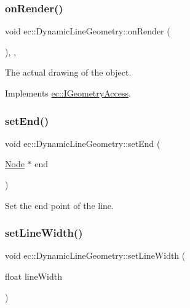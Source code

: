 \subsubsection{\texorpdfstring{on\+Render()}{onRender()}}
{\footnotesize\ttfamily void ec\+::\+Dynamic\+Line\+Geometry\+::on\+Render (\begin{DoxyParamCaption}{ }\end{DoxyParamCaption})\hspace{0.3cm}{\ttfamily [override]}, {\ttfamily [protected]}, {\ttfamily [virtual]}}



The actual drawing of the object. 



Implements \mbox{\hyperlink{classec_1_1_i_geometry_access_a2ee418c9fa4eb266347bae2f0ef8095b}{ec\+::\+I\+Geometry\+Access}}.

\mbox{\label{classec_1_1_dynamic_line_geometry_a95e48c0fcda2b81310f99b0dc113701b}} 
\subsubsection{\texorpdfstring{set\+End()}{setEnd()}}
{\footnotesize\ttfamily void ec\+::\+Dynamic\+Line\+Geometry\+::set\+End (\begin{DoxyParamCaption}\item[{\mbox{\hyperlink{classec_1_1_node}{Node}} $\ast$}]{end }\end{DoxyParamCaption})}



Set the end point of the line. 

\mbox{\label{classec_1_1_dynamic_line_geometry_ad2a5b06e7ea10c771ed17ff0ffce4b3a}} 
\subsubsection{\texorpdfstring{set\+Line\+Width()}{setLineWidth()}}
{\footnotesize\ttfamily void ec\+::\+Dynamic\+Line\+Geometry\+::set\+Line\+Width (\begin{DoxyParamCaption}\item[{float}]{line\+Width }\end{DoxyParamCaption})}



